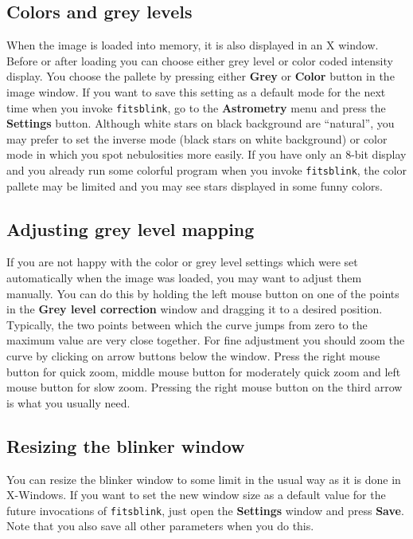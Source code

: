 \documentclass[11pt]{article}
\begin{document}
\subsection{Colors and grey levels}

When the image is loaded into memory, it is also displayed in an X
window.  Before or after loading you can choose either grey level or
color coded intensity display.  You choose the pallete by pressing
either \textbf{Grey} or \textbf{Color} button in the image window.  If
you want to save this setting as a default mode for the next time when
you invoke \verb=fitsblink=, go to the \textbf{Astrometry} menu and
press the \textbf{Settings} button.  Although white stars on black
background are ``natural'', you may prefer to set the inverse mode
(black stars on white background) or color mode in which you spot
nebulosities more easily.  If you have only an 8-bit display and you
already run some colorful program when you invoke \verb=fitsblink=,
the color pallete may be limited and you may see stars displayed in
some funny colors.

\subsection{Adjusting grey level mapping}

If you are not happy with the color or grey level settings which were
set automatically when the image was loaded, you may want to adjust
them manually.  You can do this by holding the left mouse button on
one of the points in the \textbf{Grey level correction} window and
dragging it to a desired position.  Typically, the two points between
which the curve jumps from zero to the maximum value are very close
together.  For fine adjustment you should zoom the curve by clicking
on arrow buttons below the window.  Press the right mouse button for
quick zoom, middle mouse button for moderately quick zoom and left
mouse button for slow zoom.  Pressing the right mouse button on the
third arrow is what you usually need.

\subsection{Resizing the blinker window}

You can resize the blinker window to some limit in the usual way as it
is done in X-Windows.  If you want to set the new window size as a
default value for the future invocations of \verb=fitsblink=, just open
the \textbf{Settings} window and press \textbf{Save}.  Note that you
also save all other parameters when you do this.
\end{document}
